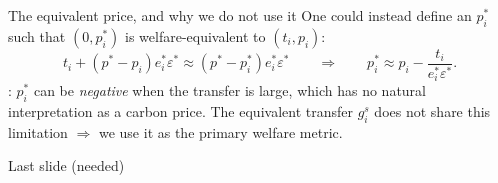 \documentclass[aspectratio=169,xcolor=dvipsnames, 11pt,mathserif]{beamer}
\newcommand{\eed}{\ee\vspace{-\dimexpr 2\topsep+\parskip+\medskipamount-3pt\relax}}
\begin{document}
\begin{frame}{The equivalent price, and why we do not use it \label{equivalent_price} \hyperlink{equivalent_variation}{}}
\bbvs
\ip One could instead define an  $p_i^*$ such that $(0,p_i^*)$ is welfare-equivalent to $(t_i,p_i)$:
\[ t_i + (p^*-p_i)e_i^*\varepsilon^* \approx (p^*-p_i^*)e_i^*\varepsilon^* \qquad\Longrightarrow\qquad p_i^* \approx p_i - \frac{t_i}{e_i^*\varepsilon^*}. \]
\eed
\bbvs
\ip {}: $p_i^*$ can be \textit{negative} when the transfer is large, which has no natural interpretation as a carbon price.
\ip The equivalent transfer $g_i^s$ does not share this limitation $\Rightarrow$ we use it as the primary welfare metric.
\ee
\end{frame}


\begin{frame}{Last slide (needed)}
\end{frame}
\end{document}
